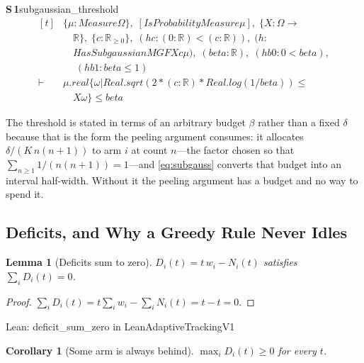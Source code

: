 \documentclass[conference]{IEEEtran}
\newtheorem{lemma}[theorem]{Lemma}
\newtheorem{corollary}[theorem]{Corollary}
\theoremstyle{definition}
\newcommand{\lean}[1]{\textsf{\footnotesize #1}}
\newcommand{\leanbox}[1]{%
  \par\vspace{2pt}\noindent
  {\footnotesize\textsf{Lean: #1}}\par\vspace{2pt}}
\begin{document}
\noindent\textbf{S\,1}\quad\lean{subgaussian\_threshold}
{\footnotesize\[ \begin{aligned}[t]
&\{ \mu : \mathit{Measure} \Omega \},\; [\mathit{IsProbabilityMeasure} \mu ],\; \{ \mathit{X} : \Omega \to\\
&\quad \mathbb{R} \},\; \{ \mathit{c} : \mathbb{R}_{\geq0} \},\; (\mathit{hc} : (0:\mathbb{R} ) < (\mathit{c} : \mathbb{R} )),\; (\mathit{h} :\\
&\quad \mathit{HasSubgaussianMGF} \mathit{X} \mathit{c} \mu ),\; (\mathit{beta} : \mathbb{R} ),\; (\mathit{hb0} : 0 < \mathit{beta}),\\
&\quad \; (\mathit{hb1} : \mathit{beta} \leq 1)\\
\vdash\;&\mu .\mathit{real} \{ \omega | \mathit{Real}.\mathit{sqrt} (2 * (\mathit{c} : \mathbb{R} ) * \mathit{Real}.\mathit{log} (1 / \mathit{beta})) \leq\\
&\quad \mathit{X} \omega \} \leq \mathit{beta}
\end{aligned} \]}


The threshold is stated in terms of an arbitrary budget $\beta$ rather than a fixed
$\delta$ because that is the form the peeling argument consumes: it allocates
$\delta/(K\,n(n+1))$ to arm $i$ at count $n$---the factor chosen so that
$\sum_{n\ge1}1/(n(n+1))=1$---and \eqref{eq:subgauss} converts that budget into an interval
half-width. Without it the peeling argument has a budget and no way to spend it.

\subsection{Deficits, and Why a Greedy Rule Never Idles}
\label{sec:deficits}

\begin{lemma}[Deficits sum to zero]
\label{lem:sumzero}
$D_{i}(t)=t\,w_{i}-N_{i}(t)$ satisfies $\sum_{i} D_{i}(t)=0$.
\end{lemma}

\begin{proof}
$\sum_{i}D_{i}(t)=t\sum_{i}w_{i}-\sum_{i}N_{i}(t)=t-t=0$.
\end{proof}

\leanbox{\lean{deficit\_sum\_zero} in \lean{LeanAdaptiveTrackingV1}}

\begin{corollary}[Some arm is always behind]
\label{cor:deficient}
$\max_{i}D_{i}(t)\ge0$ for every $t$.
\end{corollary}
\end{document}
